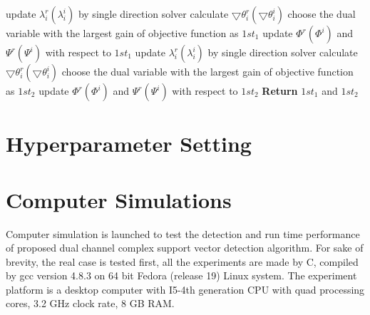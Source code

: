 \documentclass[12pt, draftclsnofoot, onecolumn]{IEEEtran}
\begin{document}
\begin{spacing}{2}
 
 \begin{algorithm}
\begin{algorithmic}
\State update $\lambda_{i}^{r}(\lambda_{i}^{i})$ by single direction solver
\State calculate $\bigtriangledown \theta_{i}^{r}(\bigtriangledown \theta_{i}^{i})$ 
\EndFor
\State choose the dual variable with the largest gain of objective function as $1st_{1}$
\State update $\Phi^{r}(\Phi^{i})$ and $\Psi^{r}(\Psi^{i})$ with respect to $1st_{1}$
 
\State update $\lambda_{i}^{r}(\lambda_{i}^{i})$ by single direction solver
\State calculate $\bigtriangledown \theta_{i}^{r}(\bigtriangledown \theta_{i}^{i})$ 
\EndFor
\State choose the dual variable with the largest gain of objective function as $1st_{2}$
\State update $\Phi^{r}(\Phi^{i})$ and $\Psi^{r}(\Psi^{i})$ with respect to $1st_{2}$
\State \textbf{Return} $1st_{1}$ and $1st_{2}$
\EndProcedure
\end{algorithmic}
\label{1D2D damping}
\end{algorithm} 
 
\section{Hyperparameter Setting}

\section{Computer Simulations}
Computer simulation is launched to test the detection and run time performance of proposed dual channel complex support vector detection algorithm. For sake of brevity, the real case is tested first, all the experiments are made by C, compiled by gcc version 4.8.3 on 64 bit Fedora (release 19) Linux system. The experiment platform is a desktop computer with I5-4th generation CPU with quad processing cores, 3.2 GHz clock rate, 8 GB RAM. 


\end{spacing}
\end{document}
